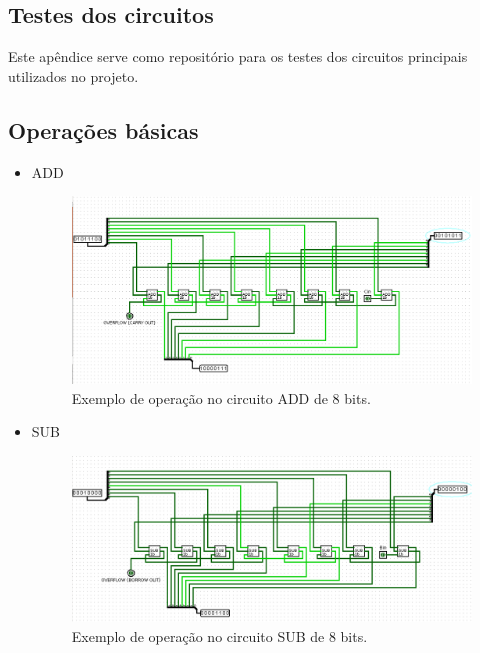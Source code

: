 \documentclass[
	12pt,				%
	openright,			%
	twoside,			%
	a4paper,			%
	english,			%
	french,				%
	spanish,			%
	brazil,				%
	]{abntex2}
\begin{document}
\begin{apendicesenv}

\chapter{Testes dos circuitos}\label{apendiceA}

Este apêndice serve como repositório para os testes dos circuitos principais utilizados no projeto.

\section{Operações básicas}
\begin{itemize}

\item {ADD}

\begin{figure}[H]
	\begin{center}
	    \includegraphics[scale=0.38]{addteste.png}
	\end{center}
\caption{\label{addteste}Exemplo de operação no circuito ADD de 8 bits.}
\end{figure}

\item {SUB}

\begin{figure}[H]
	\begin{center}
	    \includegraphics[scale=0.4]{subtratorcompleto.png}
	\end{center}
\caption{\label{subteste}Exemplo de operação no circuito SUB de 8 bits.}
\end{figure}


\end{itemize}
\end{apendicesenv}
\end{document}
